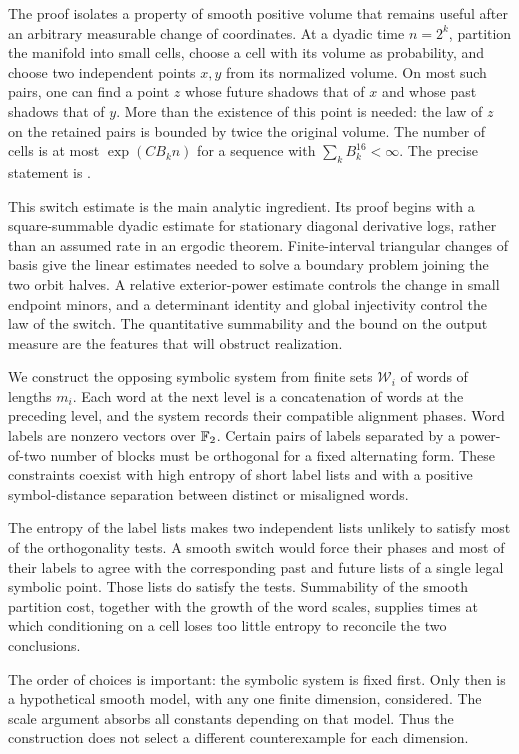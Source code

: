 The proof isolates a property of smooth positive volume that remains
useful after an arbitrary measurable change of coordinates.
At a dyadic time $n=2^k$, partition the manifold into small cells,
choose a cell with its volume as probability, and choose two independent
points $x,y$ from its normalized volume. On most such pairs, one can
find a point $z$ whose future shadows that of $x$ and whose past shadows
that of $y$. More than the existence of this point is needed:
the law of $z$ on the retained pairs is bounded by twice the original
volume. The number of cells is at most $\exp(CB_kn)$ for a sequence
with $\sum_k B_k^{16}<\infty$.
The precise statement is .

This switch estimate is the main analytic ingredient. Its proof begins
with a square-summable dyadic estimate for stationary diagonal
derivative logs, rather than an assumed rate in an ergodic theorem.
Finite-interval triangular changes of basis give the linear
estimates needed to solve a boundary problem joining the two orbit
halves. A relative exterior-power estimate controls the change in
small endpoint minors, and a determinant identity and global
injectivity control the law of the switch.
The quantitative summability and the bound on the output measure are
the features that will obstruct realization.

We construct the opposing symbolic system from finite sets
$\mathcal W_i$ of words of lengths $m_i$. Each word at the next level is
a concatenation of words at the preceding level, and the system
records their compatible alignment phases. Word labels are nonzero
vectors over $\mathbb F_2$. Certain pairs of labels separated by a power-of-two
number of blocks must be orthogonal for a fixed alternating form.
These constraints coexist with high entropy of short label lists and
with a positive symbol-distance separation between distinct or
misaligned words.

The entropy of the label lists makes two independent lists unlikely
to satisfy most of the orthogonality tests. A smooth switch would
force their phases and most of their labels to agree with the
corresponding past and future lists of a single legal symbolic point.
Those lists do satisfy the tests. Summability of the smooth partition
cost, together with the growth of the word scales, supplies times at
which conditioning on a cell loses too little entropy to reconcile
the two conclusions.

The order of choices is important: the symbolic system is fixed first.
Only then is a hypothetical smooth model, with any one finite
dimension, considered. The scale argument absorbs all constants
depending on that model. Thus the construction does not select a
different counterexample for each dimension.

